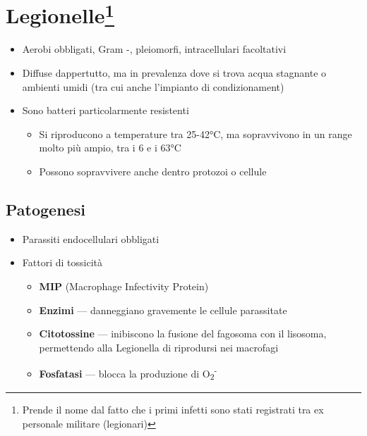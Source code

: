 \documentclass[italian,]{article}
\providecommand{\tightlist}{%
  \setlength{\itemsep}{0pt}\setlength{\parskip}{0pt}}
\begin{document}
\hypertarget{legionelle}{%
\section[Legionelle]{\texorpdfstring{Legionelle\footnote{Prende il nome
  dal fatto che i primi infetti sono stati registrati tra ex personale
  militare (legionari)}}{Legionelle}}\label{legionelle}}

\begin{itemize}
\tightlist
\item
  Aerobi obbligati, Gram -, pleiomorfi, intracellulari facoltativi
\item
  Diffuse dappertutto, ma in prevalenza dove si trova acqua stagnante o
  ambienti umidi (tra cui anche l'impianto di condizionament)
\item
  Sono batteri particolarmente resistenti

  \begin{itemize}
  \tightlist
  \item
    Si riproducono a temperature tra 25-42°C, ma sopravvivono in un
    range molto più ampio, tra i 6 e i 63°C
  \item
    Possono sopravvivere anche dentro protozoi o cellule
  \end{itemize}
\end{itemize}

\hypertarget{patogenesi-8}{%
\subsection{Patogenesi}\label{patogenesi-8}}

\begin{itemize}
\tightlist
\item
  Parassiti endocellulari obbligati
\item
  Fattori di tossicità

  \begin{itemize}
  \tightlist
  \item
    \textbf{MIP} (Macrophage Infectivity Protein)
  \item
    \textbf{Enzimi} --- danneggiano gravemente le cellule parassitate
  \item
    \textbf{Citotossine} --- inibiscono la fusione del fagosoma con il
    lisosoma, permettendo alla Legionella di riprodursi nei macrofagi
  \item
    \textbf{Fosfatasi} --- blocca la produzione di
    O\textsubscript{2}\textsuperscript{-}
  \end{itemize}
\end{itemize}
\end{document}
